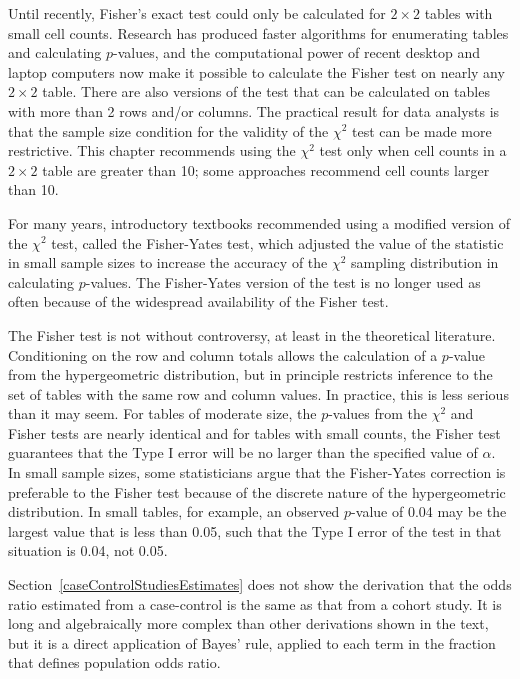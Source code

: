 Until recently, Fisher's exact test could only be calculated for $2 \times 2$ tables with small cell counts. Research has produced faster algorithms for enumerating tables and calculating $p$-values, and the computational power of recent desktop and laptop computers now make it possible to calculate the Fisher test on nearly any $2 \times 2$ table.  There are also versions of the test that can be calculated on tables with more than 2 rows and/or columns.  The practical result for data analysts is that the sample size condition for the validity of the $\chi^2$ test can be made more restrictive.  This chapter recommends using the $\chi^2$ test only when cell counts in a $2 \times 2$ table are greater than 10; some approaches recommend cell counts larger than 10.

For many years, introductory textbooks recommended using a modified version of the $\chi^2$ test, called the Fisher-Yates test, which adjusted the value of the statistic in small sample sizes to increase the accuracy of the $\chi^2$ sampling distribution in calculating $p$-values.  The Fisher-Yates version of the test is no longer used as often because of the widespread availability of the Fisher test.

The Fisher test is not without controversy, at least in the theoretical literature.  Conditioning on the row and column totals allows the calculation of a $p$-value from the hypergeometric distribution, but in principle restricts inference to the set of tables with the same row and column values.  In practice, this is less serious than it may seem. For tables of moderate size, the $p$-values from the $\chi^2$ and Fisher tests are nearly identical and for tables with small counts, the Fisher test guarantees that the Type I error will be no larger than the specified value of $\alpha$.   In small sample sizes, some statisticians argue that the Fisher-Yates correction is preferable to the Fisher test because of the discrete nature of the hypergeometric distribution.  In small tables, for example, an observed $p$-value of 0.04 may be the largest value that is less than 0.05, such that the Type I error of the test in that situation is 0.04, not 0.05.

Section~\ref{caseControlStudiesEstimates} does not show the derivation that the odds ratio estimated from a case-control is the same as that from a cohort study. It is long and algebraically more complex than other derivations shown in the text, but it is a direct application of Bayes' rule, applied to each term in the fraction that defines population odds ratio.


